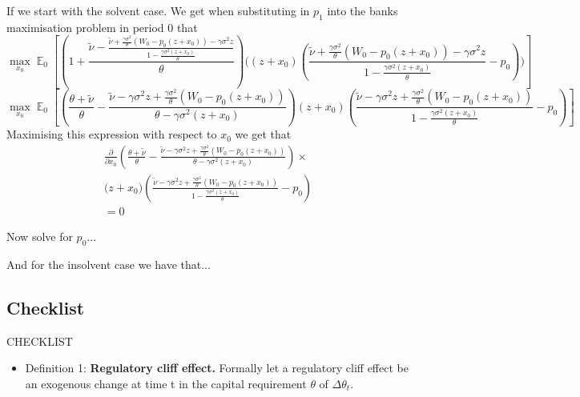 \documentclass[11pt]{article}
\DeclareMathOperator{\E}{\mathbb{E}} %
\begin{document}
\begin{appendices}
If we start with the solvent case. We get when substituting in $p_1$ into the banks maximisation problem in period 0 that
\begin{equation}
\max_{x_0} \E_0\left[\left(1 + \frac{\tilde{\nu} -\frac{\tilde{\nu} + \frac{\gamma \sigma^2}{\theta}(W_0 - p_0(z+x_0)) - \gamma \sigma^2z}{1 - \frac{\gamma\sigma^2(z+x_0)}{\theta}}}{\theta}\right)\bigg(\left(z+x_0\right)\left(\frac{\tilde{\nu} + \frac{\gamma \sigma^2}{\theta}(W_0 - p_0(z+x_0)) - \gamma \sigma^2z}{1 - \frac{\gamma\sigma^2(z+x_0)}{\theta}} - p_0\right) \bigg)  \right]
\end{equation}
\begin{equation}
\max_{x_0} \E_0\left[\left(\frac{\theta + \tilde{\nu}}{\theta} - \frac{\tilde{\nu} - \gamma \sigma^2z + \frac{\gamma \sigma^2}{\theta}(W_0 - p_0(z+x_0)) }{\theta - \gamma\sigma^2(z+x_0)}\right)\left(z+x_0\right)\left(\frac{\tilde{\nu} - \gamma \sigma^2z + \frac{\gamma \sigma^2}{\theta}(W_0 - p_0(z+x_0)) }{1 - \frac{\gamma\sigma^2(z+x_0)}{\theta}} - p_0\right)  \right]
\end{equation}
Maximising this expression with respect to $x_0$ we get that 
\begin{equation}
\begin{split}
\frac{\partial}{\partial x_0}\left(\frac{\theta + \tilde{\nu}}{\theta} - \frac{\tilde{\nu}  - \gamma \sigma^2z + \frac{\gamma \sigma^2}{\theta}(W_0 - p_0(z+x_0))}{\theta - \gamma\sigma^2(z+x_0)}\right)\times \\
\bigg(z+x_0\bigg)  \left(\frac{\tilde{\nu}  - \gamma \sigma^2z + \frac{\gamma \sigma^2}{\theta}(W_0 - p_0(z+x_0))}{1 - \frac{\gamma\sigma^2(z+x_0)}{\theta}} - p_0\right) \\
=0
\end{split}
\end{equation}

Now solve for $p_0$...

And for the insolvent case we have that...

\subsection{Checklist}
\newpage
CHECKLIST

\begin{itemize}
\item Definition 1: \textbf{Regulatory cliff effect.} Formally let a regulatory cliff effect be an exogenous change at time t in the capital requirement $\theta$ of $\Delta \theta_t$. 


\end{itemize}
\end{appendices}
\end{document}
